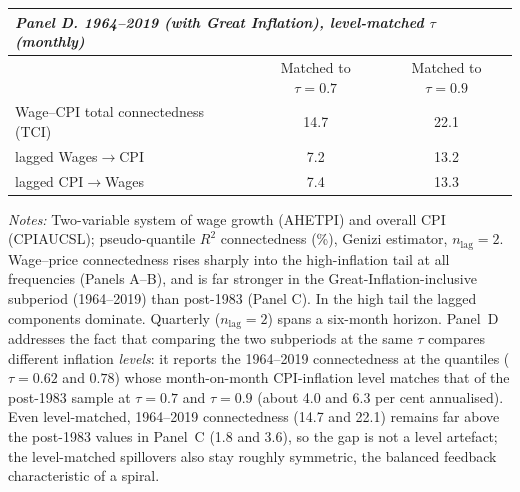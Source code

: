 \begin{table}[!ht]
\begin{threeparttable}
\vspace{4pt}
\begin{tabular}{l c c}
\multicolumn{3}{l}{\textit{Panel D. 1964--2019 (with Great Inflation), level-matched $\tau$ (monthly)}}\\
\toprule
 & Matched to $\tau{=}0.7$ & Matched to $\tau{=}0.9$ \\
\midrule
Wage--CPI total connectedness (TCI) & 14.7 & 22.1 \\
\quad lagged Wages$\to$CPI & 7.2 & 13.2 \\
\quad lagged CPI$\to$Wages & 7.4 & 13.3 \\
\bottomrule
\end{tabular}
\begin{tablenotes}[flushleft]\footnotesize
\item \textit{Notes:} Two-variable system of wage growth (AHETPI) and overall CPI (CPIAUCSL); pseudo-quantile $R^2$ connectedness (\%), Genizi estimator, $n_{\text{lag}}=2$. Wage--price connectedness rises sharply into the high-inflation tail at all frequencies (Panels A--B), and is far stronger in the Great-Inflation-inclusive subperiod (1964--2019) than post-1983 (Panel C). In the high tail the lagged components dominate. Quarterly ($n_{\text{lag}}=2$) spans a six-month horizon. Panel~D addresses the fact that comparing the two subperiods at the same $\tau$ compares different inflation \emph{levels}: it reports the 1964--2019 connectedness at the quantiles ($\tau=0.62$ and $0.78$) whose month-on-month CPI-inflation level matches that of the post-1983 sample at $\tau=0.7$ and $\tau=0.9$ (about 4.0 and 6.3 per cent annualised). Even level-matched, 1964--2019 connectedness (14.7 and 22.1) remains far above the post-1983 values in Panel~C (1.8 and 3.6), so the gap is not a level artefact; the level-matched spillovers also stay roughly symmetric, the balanced feedback characteristic of a spiral.
\end{tablenotes}
\end{threeparttable}
\end{table}

